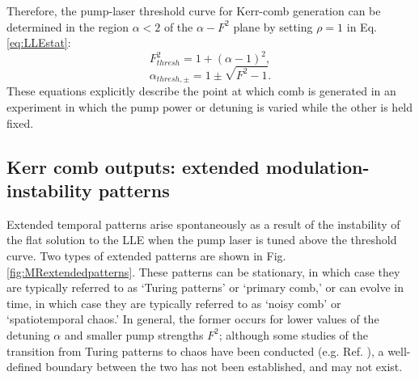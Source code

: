 Therefore, the pump-laser threshold curve for Kerr-comb generation can be determined in the region $\alpha<2$ of the $\alpha-F^2$ plane by setting $\rho=1$ in Eq. \ref{eq:LLEstat}: 
\begin{equation}
F^2_{thresh}=1+(\alpha-1)^2, \label{eq:F2thresh}
\end{equation}
\begin{equation}
\alpha_{thresh,\pm}=1\pm\sqrt{F^2-1}. \label{eq:alphathresh}
\end{equation}
These equations explicitly describe the point at which comb is generated in an experiment in which the pump power or detuning is varied while the other is held fixed. 



\subsection{Kerr comb outputs: extended modulation-instability patterns}

Extended temporal patterns arise spontaneously as a result of the instability of the flat solution to the LLE when the pump laser is tuned above the threshold curve. Two types of extended patterns are shown in Fig. \ref{fig:MRextendedpatterns}. These patterns can be stationary, in which case they are typically referred to as `Turing patterns' or `primary comb,' or can evolve in time, in which case they are typically referred to as `noisy comb' or `spatiotemporal chaos.' In general, the former occurs for lower values of the detuning $\alpha$ and smaller pump strengths $F^2$; although some studies of the transition from Turing patterns to chaos have been conducted (e.g. Ref. ), a well-defined boundary between the two has not been established, and may not exist. 

